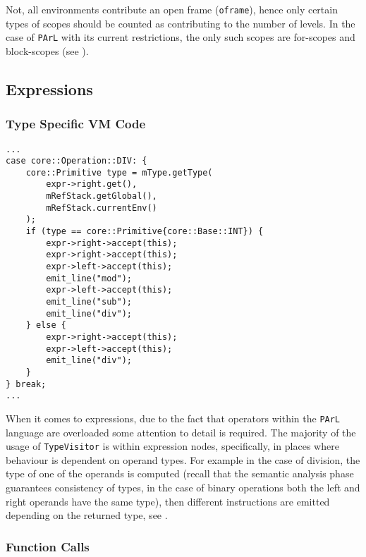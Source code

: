 \begin{note}
Not, all environments contribute an open frame
(\texttt{oframe}), hence only certain types of scopes should be
counted as contributing to the number of levels. In the case of
\texttt{PArL} with its current restrictions, the only such
scopes are for-scopes and block-scopes (see
).
\end{note}

\subsection{Expressions}

\subsubsection{Type Specific VM Code}

\begin{lstlisting}[caption={A segment of the
\texttt{visit(Binary *)} method in the \texttt{GenVisitor} class
(ir\_gen/GenVisitor.cpp)}, label=lst:overloadeddiv]
...
case core::Operation::DIV: {
    core::Primitive type = mType.getType(
        expr->right.get(),
        mRefStack.getGlobal(),
        mRefStack.currentEnv()
    );
    if (type == core::Primitive{core::Base::INT}) {
        expr->right->accept(this);
        expr->right->accept(this);
        expr->left->accept(this);
        emit_line("mod");
        expr->left->accept(this);
        emit_line("sub");
        emit_line("div");
    } else {
        expr->right->accept(this);
        expr->left->accept(this);
        emit_line("div");
    }
} break;
...
\end{lstlisting}

When it comes to expressions, due to the fact that operators
within the \texttt{PArL} language are overloaded some attention
to detail is required. The majority of the usage of
\texttt{TypeVisitor} is within expression nodes, specifically,
in places where behaviour is dependent on operand types. For
example in the case of division, the type of one of the operands
is computed (recall that the semantic analysis phase guarantees
consistency of types, in the case of binary operations both the
left and right operands have the same type), then different
instructions are emitted depending on the returned type, see
.

\subsubsection{Function Calls}

